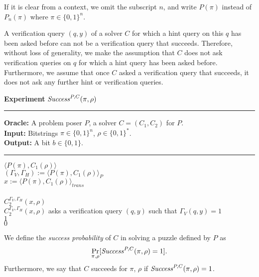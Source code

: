%
If it is clear from a context, we omit the subscript $n$, and write $P(\pi)$ instead of $P_n(\pi)$ where $\pi \in \{0,1\}^{n}$.

A verification query $(q,y)$ of a solver $C$ for which a hint query on this $q$ has been asked before can not be a verification query that succeeds.
Therefore, without loss of generality, we make the assumption that $C$ does not ask verification queries on $q$
for which a hint query has been asked before. Furthermore, we assume that once $C$ asked a verification query that succeeds,
it does not ask any further hint or verification queries.

%
\begin{codeblock}
  \textbf{Experiment} $\operatorname{\mathit{Success}}^{P, C}(\pi, \rho)$
  \medskip \hrule \medskip
  \textbf{Oracle:} A problem poser $P$, a solver $C = (C_1, C_2)$ for $P$.\\
  \textbf{Input:}  Bitstrings $\pi \in \{0,1\}^n$, $\rho \in \{0,1\}^*$.\\
  \textbf{Output:} A bit $b \in \{0,1\}$.
  \medskip\hrule\medskip
  \Run $\langle P(\pi), C_1(\rho) \rangle$ \\
  \IndI $(\Gamma_V, \Gamma_H) := \langle P(\pi), C_1(\rho) \rangle_{P}$ \\
  \IndI $x := \langle P(\pi), C_1(\rho) \rangle_{\mathit{trans}}$ \\ \\
  \Run $C_2^{\Gamma_V,\Gamma_H}(x, \rho)$ \\
  \IndI \If $C_2^{\Gamma_V, \Gamma_H}(x, \rho)$ asks a verification query $(q, y)$ such that $\Gamma_V(q, y) = 1$ \Then \\
  \IndII \Return $1$ \\
  \Return $0$ \\
\end{codeblock}
%
We define the \textit{success probability} of $C$ in solving a puzzle defined by $P$ as
\begin{align}
 \underset{\pi, \rho}{\Pr}[\operatorname{\mathit{Success}}^{P,C}(\pi, \rho) = 1].
\end{align}
Furthermore, we say that $C$ succeeds for $\pi$, $\rho$ if $\operatorname{\mathit{Success}}^{P,C}(\pi, \rho) = 1$.
%

